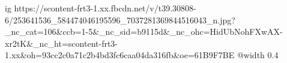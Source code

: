  
 
 
 
 

\ifcmt
  ig https://scontent-frt3-1.xx.fbcdn.net/v/t39.30808-6/253641536_584474046195596_7037281369844516043_n.jpg?_nc_cat=106&ccb=1-5&_nc_sid=b9115d&_nc_ohc=HidUbNohFXwAX-xr2tK&_nc_ht=scontent-frt3-1.xx&oh=93cc2c0a71c2b4bd3fc6caa04da316fb&oe=61B9F7BE
  @width 0.4
\fi
